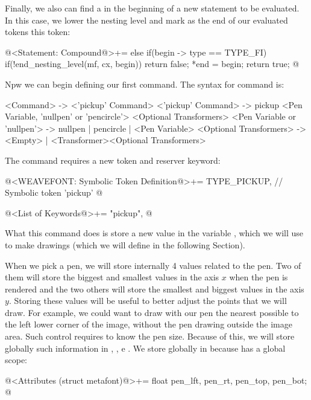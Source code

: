 {{{{{Finally, we also can find a  in the beginning of a new
statement to be evaluated. In this case, we lower the nesting level
and mark as the end of our evaluated tokens this 
token:

\iniciocodigo
@<Statement: Compound@>+=
else if(begin -> type == TYPE_FI){
  if(!end_nesting_level(mf, cx, begin))
    return false;
  *end = begin;
  return true;
}
@
\fimcodigo


Npw we can begin defining our first command. The syntax for
command  is:

\alinhaverbatim
<Command> -> <'pickup' Command>
<'pickup' Command> -> pickup <Pen Variable, 'nullpen' or 'pencircle'>
                             <Optional Transformers>
<Pen Variable or 'nullpen'> -> nullpen | pencircle | <Pen Variable>
<Optional Transformers> -> <Empty> |
                           <Transformer><Optional Transformers>
\alinhanormal

The command requires a new token and reserver keyword:

\iniciocodigo
@<WEAVEFONT: Symbolic Token Definition@>+=
TYPE_PICKUP,  // Symbolic token 'pickup'
@
\fimcodigo

\iniciocodigo
@<List of Keywords@>+=
"pickup",
@
\fimcodigo

What this command does is store a new value in the
variable , which we will use to make drawings
(which we will define in the following Section).


When we pick a pen, we will store internally 4 values related to the
pen. Two of them will store the biggest and smallest values in the
axis $x$ when the pen is rendered and the two others will store the
smallest and biggest values in the axis $y$. Storing these values will
be useful to better adjust the points that we will draw. For example,
we could want to draw with our pen the nearest possible to the left
lower corner of the image, without the pen drawing outside the image
area. Such control requires to know the pen size. Because of this, we
will store globally such information
in , , 
e . We store globally in  because  has a global scope:

\iniciocodigo
@<Attributes (struct metafont)@>+=
float pen_lft, pen_rt, pen_top, pen_bot;
@
\fimcodigo

}}}}}
